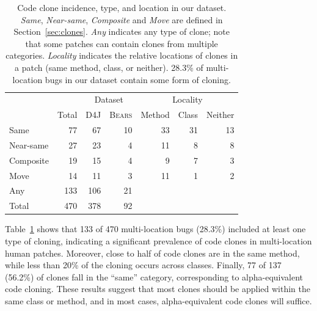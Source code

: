 \documentclass[10pt,journal,compsoc]{IEEEtran}
\newcommand\bears{\textsc{Bears}\xspace}
\begin{document}
\begin{table}
{\begin{center}
\begin{tabular} {lrrrrrr}
\toprule
&&\multicolumn{2}{c}{Dataset} &\multicolumn{3}{c}{Locality}\\
& Total & D4J & \bears & Method & Class & Neither\\
\midrule
Same      &  77 & 67  & 10 & 33 & 31 & 13 \\
Near-same   & 27  & 23  & 4 & 11 & 8  & 8  \\
Composite &  19 & 15  & 4 & 9  & 7  & 3  \\
Move      &  14 & 11  & 3 & 11  & 1  & 2  \\
\midrule
Any       & 133 & 106 & 21 \\
Total     & 470 & 378 & 92\\
\bottomrule
\end{tabular}
\end{center}
}
\caption{\small Code clone incidence, type, and location in our dataset. \emph{Same}, \emph{Near-same},
  \emph{Composite} and \emph{Move} are defined in Section~\ref{sec:clones}.
  \emph{Any} indicates any type of clone; note that some patches can
  contain clones from multiple categories. \emph{Locality} indicates
  the relative locations of clones in a patch (same method, class, or neither). 28.3\% of multi-location bugs
  in our dataset contain some form of cloning. }
\label{tab:clones}
\end{table}

Table~\ref{tab:clones} shows that 133 of 470 multi-location bugs
(28.3\%) included at least one type of cloning,
indicating a significant prevalence of code clones in multi-location human
patches.
%
Moreover, close to half of code clones are in the same method, while less than
20\% of the cloning occurs across classes. Finally, 77 of 137 (56.2\%) of clones
fall in the ``same'' category, corresponding to alpha-equivalent code cloning.
These results suggest that 
most clones should be applied within the same class or method, and
in most cases, alpha-equivalent code clones will suffice.

\end{document}
